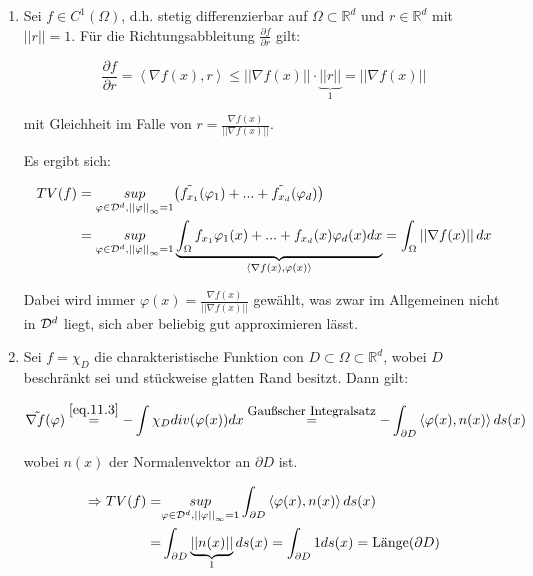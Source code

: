 \documentclass{article}
\theoremstyle{plain}
\theoremstyle{definition}
\numberwithin{equation}{section}
\newcommand{\norm}[1] {
\left|\left| #1 \right|\right|
}
\newcommand{\skprod}[2]{
\left \langle #1,#2 \right \rangle
}
\newcommand{\R}[0] {
\mathbb R
}
\newcommand{\C}[0]{
    \cdot
}
\begin{document}
\begin{enumerate}
    \item Sei $f \in C^1(\Omega)$, d.h. stetig differenzierbar auf $\Omega \subset \R^d$ und $r \in \R^d$ mit $\norm{r}=1$. Für die Richtungsabbleitung $\frac{\partial f}{\partial r}$ gilt:

    \[\frac{\partial f}{\partial r} = \skprod{\nabla f(x)}{r} \leq \norm{\nabla f(x)} \C \underbrace{\norm{r}}_{1} = \norm{\nabla f(x)}\]

    mit Gleichheit im Falle von $r = \frac{\nabla f(x)}{\norm{\nabla f(x)}}$.

    Es ergibt sich:

    \begin{align}\label{eq.11.5}
        TV(f) &= \underset{\varphi \in \D^d, \norm{\varphi}_\infty = 1}{sup} \bigl(\tilde{f_{x_1}}(\varphi_1) + ... + \tilde{f_{x_d}}(\varphi_d)\bigr) \nonumber \\
        &= \underset{\varphi \in \D^d, \norm{\varphi}_\infty = 1}{sup} \underbrace{\int_\Omega f_{x_1}\varphi_1(x) + ... + f_{x_d}(x)\varphi_d(x) dx}_{\skprod{\nabla f(x)}{\varphi(x)}} = \int_\Omega \norm{\nabla f(x)} dx
    \end{align}

    Dabei wird immer $\varphi(x) = \frac{\nabla f(x)}{\norm{\nabla f(x)}}$ gewählt, was zwar im Allgemeinen nicht in $\mathcal{D}^d$ liegt, sich aber beliebig gut approximieren lässt.

    \item Sei $f= \chi_D$ die charakteristische Funktion con $D \subset \Omega \subset \R^d$, wobei $D$ beschränkt sei und stückweise glatten Rand besitzt.
    Dann gilt:

    \[\tilde{\nabla f}(\varphi) \overset{\eqref{eq.11.3}}{=} - \int \chi_D div(\varphi(x)) dx \overset{\text{\small{Gaußscher Integralsatz}}}{=} -\int_{\partial D} \skprod{\varphi(x)}{n(x)} ds(x)\]

    wobei $n(x)$ der Normalenvektor an $\partial D$ ist.

    \begin{align}
        \Rightarrow TV(f) =& \underset{\varphi \in \D^d, \norm{\varphi}_\infty = 1}{sup} \int_{\partial D} \skprod{\varphi(x)}{n(x)} ds(x) \nonumber \\
        =& \int_{\partial D}\underbrace{\norm{n(x)}}_{1} ds(x) = \int_{\partial D} 1 ds(x) = \text{Länge}(\partial D)
    \end{align}
\end{enumerate}
\end{document}

